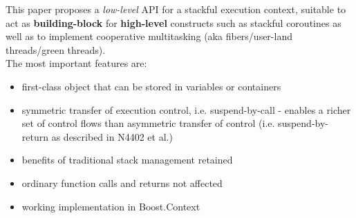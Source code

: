 This paper proposes a \emph{low-level} API for a stackful execution context,
suitable to act as {\bfseries building-block} for {\bfseries high-level}
constructs such as stackful coroutines as well as to implement cooperative
multitasking (aka fibers/user-land threads/green threads).\\
\newline
The most important features are:
\begin{itemize}
    \item first-class object that can be stored in variables or containers
    \item symmetric transfer of execution control, i.e. suspend-by-call -
          enables a richer set of control flows than asymmetric transfer of
          control (i.e. suspend-by-return as described in N4402\cite{N4402} et al.)
    \item benefits of traditional stack management retained
    \item ordinary function calls and returns not affected
    \item working implementation in Boost.Context\cite{bcontext}
\end{itemize}
